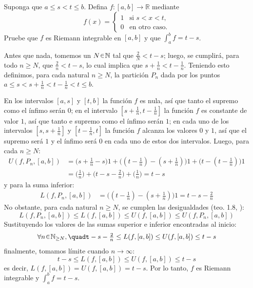 \begin{ejer}
Suponga que $a \le s < t \le b$. Defina $f \colon [a, b] \to \mathbb{R}$ mediante
$$
f(x) = \begin{cases} 
1 & \text{si } s < x < t, \\
0 & \text{en otro caso.}
\end{cases}
$$
Pruebe que $f$ es Riemann integrable en $[a, b]$ y que $\int_a^b f = t - s$.
\end{ejer}
\begin{sol}
Antes que nada, tomemos un $N\en\mathbb{N}$ tal que $\frac{2}{N} < t-s$; luego, se cumplirá, para todo $n\ge N$, que $\frac{2}{n} < t-s$, lo cual implica que $s + \frac{1}{n} < t-\frac{1}{n}$. Teniendo esto definimos, para cada natural $n\ge N$, la partición $P_n$ dada por los puntos $a \leq s < s + \frac{1}{n} < t - \frac{1}{n} < t \leq b$. \par
En los intervalos $[a,s]$ y $[t,b]$ la función $f$ es nula, así que tanto el supremo como el ínfimo serán $0$; en el intervalo $[s+\frac{1}{n},t-\frac{1}{n}]$ la función $f$ es constante de valor $1$, así que tanto e supremo como el ínfimo serán $1$; en cada uno de los intervalos $[s , s + \frac{1}{n}]$ y $[t - \frac{1}{n} , t]$ la función $f$ alcanza los valores $0$ y $1$, así que el supremo será $1$ y el ínfimo será $0$ en cada uno de estos dos intervalos. Luego, para cada $n\ge N$:
\begin{align*}
U(f,P_n,[a,b])%
&= \big(s+\tfrac{1}{n} - s\big)1 + \big((t-\tfrac{1}{n})-(s+\tfrac{1}{n})\big)1 + \big(t-(t-\tfrac{1}{n})\big)1\\
&= \big(\tfrac{1}{n}\big) + \big(t-s-\tfrac{2}{n}\big) + \big(\tfrac{1}{n}\big) = t-s
\end{align*}
y para la suma inferior:
\begin{align*}
L(f,P_n,[a,b])%
&= \big((t-\tfrac{1}{n})-(s+\tfrac{1}{n})\big)1 = t-s-\tfrac{2}{n}
\end{align*}
No obstante, para cada natural $n \geq N$, se cumplen las desigualdades (teo. 1.8, \cite{Axler}): 
\[
L(f,P_n,[a,b]) \leq L(f,[a,b]) \leq U(f,[a,b]) \leq U(f,P_n,[a,b])
\]
Sustituyendo los valores de las sumas superior e inferior encontradas al inicio:
\[
\forall n\en\mathbb{N}_{\ge N},%
\quad%
t-s-\tfrac{2}{n} \leq L(f,[a,b]) \leq U(f,[a,b]) \leq t-s
\]
finalmente, tomamos límite cuando $n\to\infty$:
\[
t-s \leq L(f,[a,b]) \leq U(f,[a,b]) \leq t-s
\]
es decir, $L(f,[a,b]) = U(f,[a,b]) = t-s$. Por lo tanto, $f$ es Riemann integrable y $\int^b_af= t-s$. 
\end{sol}

